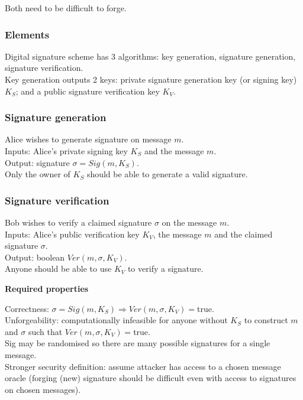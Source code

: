 \documentclass{article}
\begin{document}
Both need to be difficult to forge.

\subsubsection{Elements}

Digital signature scheme has 3 algorithms: key generation, signature generation, signature verification.\\
Key generation outputs 2 keys: private signature generation key (or signing key) $K_S$; and a public signature verification key $K_V$.

\subsubsection{Signature generation}

Alice wishes to generate signature on message $m$.\\
Inputs: Alice's private signing key $K_S$ and the message $m$.\\
Output: signature $\sigma = Sig(m, K_S)$.\\
Only the owner of $K_S$ should be able to generate a valid signature.

\subsubsection{Signature verification}

Bob wishes to verify a claimed signature $\sigma$ on the message $m$.\\
Inputs: Alice's public verification key $K_V$, the message $m$ and the claimed signature $\sigma$.\\
Output: boolean $Ver(m,\sigma,K_V)$.\\
Anyone should be able to use $K_V$ to verify a signature.

\textbf{Required properties}

Correctness: $\sigma = Sig(m,K_S) \Rightarrow Ver(m,\sigma,K_V) = $true.\\
Unforgeability: computationally infeasible for anyone without $K_S$ to construct $m$ and $\sigma$ such that $Ver(m,\sigma,K_V) = $true.\\
Sig may be randomised so there are many possible signatures for a single message.\\
Stronger security definition: assume attacker has access to a chosen message oracle (forging (new) signature should be difficult even with access to signatures on chosen messages).
\end{document}
